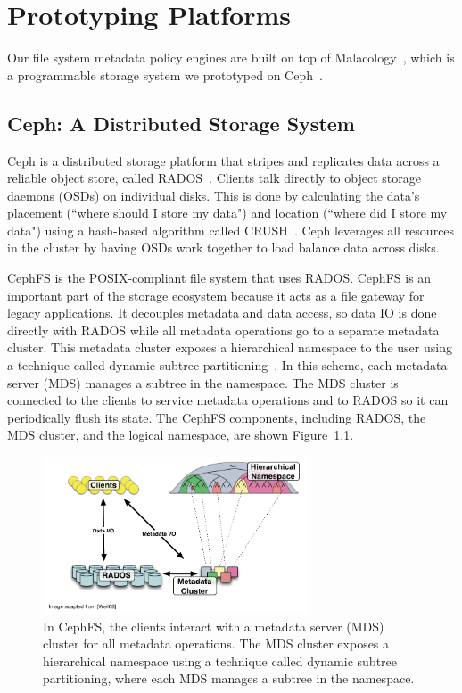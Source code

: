 \chapter{Prototyping Platforms}
\label{chp:prototyping-platform}

Our file system metadata policy engines are built on top of
Malacology~\cite{sevilla:eurosys17-malacology}, which is a programmable storage
system we prototyped on Ceph~\cite{weil:osdi2006-ceph}.

\section{Ceph: A Distributed Storage System}

Ceph is a distributed storage platform that stripes and replicates data across
a reliable object store, called RADOS~\cite{weil_rados_2007}. Clients talk
directly to object storage daemons (OSDs) on individual disks. This is done by
calculating the data's placement (``where should I store my data") and location
(``where did I store my data") using a hash-based algorithm called
CRUSH~\cite{weil_crush_2006}. Ceph leverages all resources in the cluster by
having OSDs work together to load balance data across disks.

CephFS is the POSIX-compliant file system that uses RADOS. CephFS is an
important part of the storage ecosystem because it acts as a file gateway for
legacy applications. It decouples metadata and data access, so data IO is done
directly with RADOS while all metadata operations go to a separate metadata
cluster. This metadata cluster exposes a hierarchical namespace to the user
using a technique called dynamic subtree
partitioning~\cite{weil:sc2004-dyn-metadata}. In this scheme, each metadata
server (MDS) manages a subtree in the namespace. The MDS cluster is connected
to the clients to service metadata operations and to RADOS so it can
periodically flush its state. The CephFS components, including RADOS, the MDS
cluster, and the logical namespace, are shown Figure~\ref{ceph-arch}. 

\begin{figure}[t]
\centering
	\includegraphics[width=0.7\textwidth]{./chapters/advancement/figures/ceph-arch.png} 

	\caption{In CephFS, the clients interact with a metadata server (MDS)
        cluster for all metadata operations. The MDS cluster exposes a hierarchical
        namespace using a technique called dynamic subtree partitioning, where each MDS
        manages a subtree in the namespace.\label{ceph-arch}}

\end{figure}


